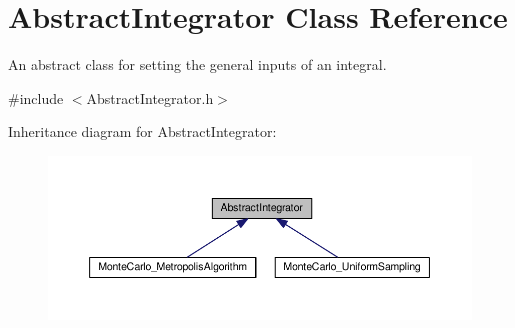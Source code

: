 \hypertarget{class_abstract_integrator}{}\section{Abstract\+Integrator Class Reference}
\label{class_abstract_integrator}


An abstract class for setting the general inputs of an integral.  




{\ttfamily \#include $<$Abstract\+Integrator.\+h$>$}



Inheritance diagram for Abstract\+Integrator\+:\nopagebreak
\begin{figure}[H]
\begin{center}
\leavevmode
\includegraphics[width=350pt]{class_abstract_integrator__inherit__graph}
\end{center}
\end{figure}
